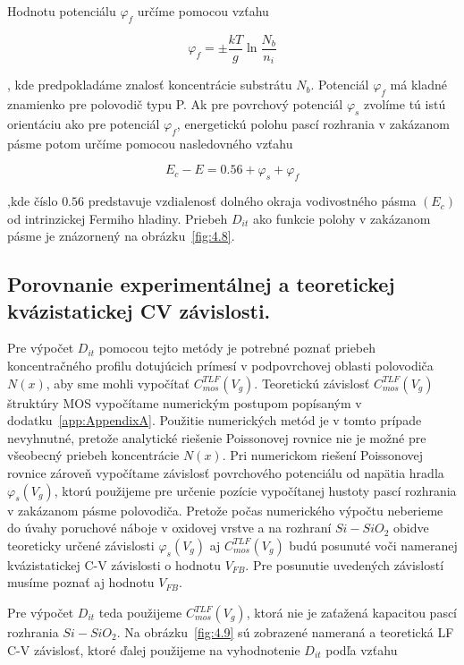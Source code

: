Hodnotu potenciálu $\varphi_{f}$ určíme pomocou vzťahu

\begin{equation}\label{eq:4.16}
  \varphi_{f} = \pm \frac{kT}{g} \ln{\frac{N_{b}}{n_{i}}}
\end{equation}

, kde predpokladáme znalosť koncentrácie substrátu $N_{b}$. Potenciál
$\varphi_{f}$ má kladné znamienko pre polovodič typu P. Ak pre
povrchový potenciál $\varphi_{s}$ zvolíme tú istú orientáciu ako pre
potenciál $\varphi_{f}$, energetickú polohu pascí rozhrania v
zakázanom pásme potom určíme pomocou nasledovného vzťahu

\begin{equation}\label{eq:4.17}
  E_{c} - E = 0.56 + \varphi_{s} + \varphi_{f}
\end{equation}

,kde číslo $0.56$ predstavuje vzdialenosť dolného okraja vodivostného
pásma $(E_{c})$ od intrinzickej Fermiho hladiny. Priebeh $D_{it}$ ako
funkcie polohy v zakázanom pásme je znázornený na
obrázku~\ref{fig:4.8}.

\newpage
\subsection{Porovnanie experimentálnej a teoretickej kvázistatickej CV závislosti.}\label{sec:4.2.2}

Pre výpočet $D_{it}$ pomocou tejto metódy je potrebné poznať priebeh
koncentračného profilu dotujúcich prímesí v podpovrchovej oblasti
polovodiča $N(x)$, aby sme mohli vypočítať
$C_{mos}^{TLF}(V_{g})$. Teoretickú závislosť $C_{mos}^{TLF}(V_{g})$
štruktúry MOS vypočítame numerickým postupom popísaným v
dodatku~\ref{app:AppendixA}.  Použitie numerických metód je v tomto
prípade nevyhnutné, pretože analytické riešenie Poissonovej rovnice
nie je možné pre všeobecný priebeh koncentrácie $N(x)$.  Pri
numerickom riešení Poissonovej rovnice zároveň vypočítame závislosť
povrchového potenciálu od napätia hradla $\varphi_{s}(V_{g})$, ktorú
použijeme pre určenie pozície vypočítanej hustoty pascí rozhrania v
zakázanom pásme polovodiča.  Pretože počas numerického výpočtu
neberieme do úvahy poruchové náboje v oxidovej vrstve a na rozhraní
$Si-SiO_{2}$ obidve teoreticky určené závislosti $\varphi_{s}(V_{g})$
aj $C_{mos}^{TLF}(V_{g})$ budú posunuté voči nameranej kvázistatickej
C-V závislosti o hodnotu $V_{FB}$. Pre posunutie uvedených závislostí
musíme poznať aj hodnotu $V_{FB}$.

\par Pre výpočet $D_{it}$ teda použijeme $C_{mos}^{TLF}(V_{g})$, ktorá
nie je zaťažená kapacitou pascí rozhrania $Si-SiO_{2}$. Na
obrázku~\ref{fig:4.9} sú zobrazené nameraná a teoretická LF C-V
závislosť, ktoré ďalej použijeme na vyhodnotenie $D_{it}$ podľa
vzťahu

